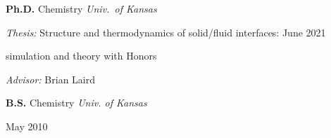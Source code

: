 {\bf Ph.D.} Chemistry \hfill \textit{Univ.\ of Kansas}

\textit{Thesis:} Structure and thermodynamics of solid/fluid interfaces: \hfill June 2021

simulation and theory \hfill with Honors

\textit{Advisor:} Brian Laird

\vspace{\y}
{\bf B.S.} Chemistry \hfill \textit{Univ. of Kansas}

\hfill May 2010
